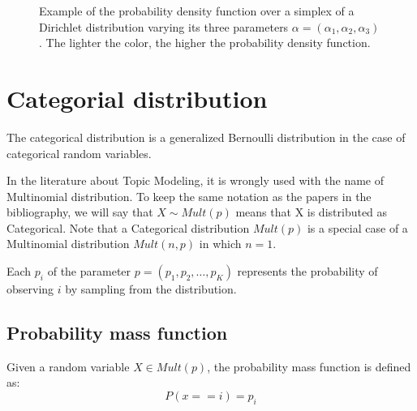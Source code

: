 \begin{figure}[H]
    \centering
    \hfill
    \caption{Example of the probability density function over a simplex of a Dirichlet distribution varying its three parameters $\alpha = (\alpha_1, \alpha_2, \alpha_3)$. The lighter the color, the higher the probability density function.}
    \label{fig:dirparams}
\end{figure}

\section{Categorial distribution}
The categorical distribution is a generalized Bernoulli distribution in the case of categorical random variables.

In the literature about Topic Modeling, it is wrongly used with the name of Multinomial distribution.
To keep the same notation as the papers in the bibliography, we will say that $X \sim Mult(p)$ means that X is distributed as Categorical.
Note that a Categorical distribution $Mult(p)$ is a special case of a Multinomial distribution $Mult(n, p)$ in which $n=1$.

Each $p_i$ of the parameter $p = (p_1, p_2, \dots, p_K)$ represents the probability of observing $i$ by sampling from the distribution.

\subsection{Probability mass function}
Given a random variable $X \in Mult(p)$, the probability mass function is defined as:
$$P(x == i) = p_i$$